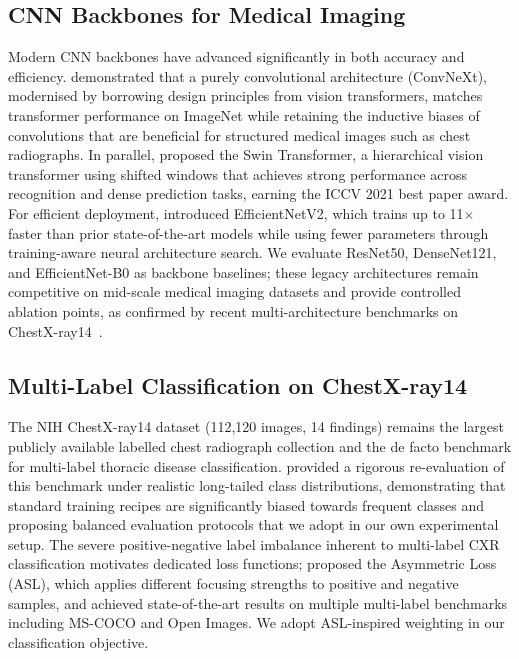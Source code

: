 \documentclass[12pt, a4paper]{article}
\begin{document}
\subsection{CNN Backbones for Medical Imaging}

Modern CNN backbones have advanced significantly in both accuracy and efficiency.
\citet{convnext2022} demonstrated that a purely convolutional architecture (ConvNeXt),
modernised by borrowing design principles from vision transformers, matches transformer
performance on ImageNet while retaining the inductive biases of convolutions that are
beneficial for structured medical images such as chest radiographs. In parallel,
\citet{swin2021} proposed the Swin Transformer, a hierarchical vision transformer using
shifted windows that achieves strong performance across recognition and dense prediction
tasks, earning the ICCV 2021 best paper award. For efficient deployment, \citet{efficientnetv2}
introduced EfficientNetV2, which trains up to 11$\times$ faster than prior state-of-the-art
models while using fewer parameters through training-aware neural architecture search.
We evaluate ResNet50, DenseNet121, and EfficientNet-B0 as backbone baselines; these
legacy architectures remain competitive on mid-scale medical imaging datasets and provide
controlled ablation points, as confirmed by recent multi-architecture benchmarks on
ChestX-ray14~\citep{holste2022}.

\subsection{Multi-Label Classification on ChestX-ray14}

The NIH ChestX-ray14 dataset (112,120 images, 14 findings) remains the largest publicly
available labelled chest radiograph collection and the de facto benchmark for multi-label
thoracic disease classification. \citet{holste2022} provided a rigorous re-evaluation of
this benchmark under realistic long-tailed class distributions, demonstrating that standard
training recipes are significantly biased towards frequent classes and proposing balanced
evaluation protocols that we adopt in our own experimental setup. The severe
positive-negative label imbalance inherent to multi-label CXR classification motivates
dedicated loss functions; \citet{asl2021} proposed the Asymmetric Loss (ASL), which
applies different focusing strengths to positive and negative samples, and achieved
state-of-the-art results on multiple multi-label benchmarks including MS-COCO and
Open Images. We adopt ASL-inspired weighting in our classification objective.
\end{document}
